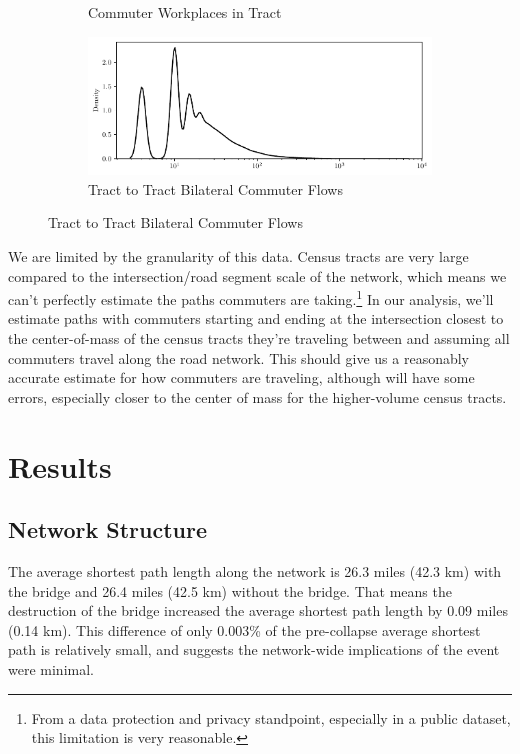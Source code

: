 \documentclass[11pt]{article}
\numberwithin{equation}{section} %
\numberwithin{figure}{section} %
\numberwithin{table}{section} %
\theoremstyle{definition}
\begin{document}
\begin{figure}[t!]
\begin{subfigure}{0.49\textwidth}
    \caption{Commuter Workplaces in Tract}
  \end{subfigure}
  \begin{subfigure}{\textwidth}
    \centering
    \includegraphics[width=\textwidth]{graphs/tract_flows.pdf}
    \caption{Tract to Tract Bilateral Commuter Flows}
  \end{subfigure}

  \label{fig:tracts}
\end{figure}

We are limited by the granularity of this data. Census tracts are very large compared to the intersection/road segment scale of the network, which means we can't perfectly estimate the paths commuters are taking.\footnote{From a data protection and privacy standpoint, especially in a public dataset, this limitation is very reasonable.} In our analysis, we'll estimate paths with commuters starting and ending at the intersection closest to the center-of-mass of the census tracts they're traveling between and assuming all commuters travel along the road network. This should give us a reasonably accurate estimate for how commuters are traveling, although will have some errors, especially closer to the center of mass for the higher-volume census tracts.


\section{Results} \label{sec:results}

\subsection{Network Structure}

The average shortest path length along the network is 26.3 miles (42.3 km) with the bridge and 26.4 miles (42.5 km) without the bridge. That means the destruction of the bridge increased the average shortest path length by 0.09 miles (0.14 km). This difference of only 0.003\% of the pre-collapse average shortest path is relatively small, and suggests the network-wide implications of the event were minimal.
\end{document}
